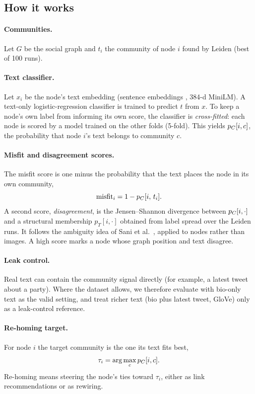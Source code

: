 \subsection{How it works}
\paragraph{Communities.}
Let $G$ be the social graph and $t_i$ the community of node $i$ found by Leiden \cite{traag2019leiden} (best of 100 runs).

\paragraph{Text classifier.}
Let $x_i$ be the node's text embedding (sentence embeddings \cite{reimers2019sbert}, 384-d MiniLM). A text-only logistic-regression classifier is trained to predict $t$ from $x$. To keep a node's own label from informing its own score, the classifier is \emph{cross-fitted}: each node is scored by a model trained on the other folds (5-fold). This yields $p_C[i,c]$, the probability that node $i$'s text belongs to community $c$.

\paragraph{Misfit and disagreement scores.}
The misfit score is one minus the probability that the text places the node in its own community,
\begin{equation}
\mathrm{misfit}_i = 1 - p_C[i,\,t_i].
\label{eq:misfit}
\end{equation}
A second score, \emph{disagreement}, is the Jensen--Shannon divergence between $p_C[i,\cdot]$ and a structural membership $p_T[i,\cdot]$ obtained from label spread over the Leiden runs. It follows the ambiguity idea of Sani et al.~\cite{sani2025aas}, applied to nodes rather than images. A high score marks a node whose graph position and text disagree.

\paragraph{Leak control.}
Real text can contain the community signal directly (for example, a latest tweet about a party). Where the dataset allows, we therefore evaluate with bio-only text as the valid setting, and treat richer text (bio plus latest tweet, GloVe) only as a leak-control reference.

\paragraph{Re-homing target.}
For node $i$ the target community is the one its text fits best,
\begin{equation}
\tau_i = \arg\max_c p_C[i,c].
\label{eq:target}
\end{equation}
Re-homing means steering the node's ties toward $\tau_i$, either as link recommendations or as rewiring.


